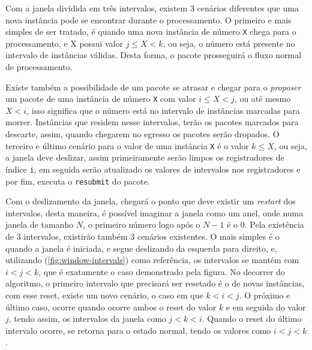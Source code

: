 \documentclass[
    12pt,
    openright, 
    oneside,
    a4paper,
    french,
    english,
    brazil
    ]{facom-ufu-abntex2}
\theoremstyle{definition}
\begin{document}

Com a janela dividida em três intervalos, existem 3 cenários diferentes que uma nova instância pode se encontrar durante o
processamento. O primeiro e mais simples de ser tratado, é quando uma nova instância de número \texttt{X} chega para
o processamento, e X possui valor $j \leq X < k$, ou seja, o número está presente no intervalo de instâncias válidas. 
Desta forma, o pacote prosseguirá o fluxo normal de processamento.

Existe também a possibilidade de um pacote se atrasar e chegar para o \emph{proposer} um pacote de uma instância de número
\texttt{X} com valor $i \leq X < j$, ou até mesmo $X < i$, isso significa que o número está no intervalo de instâncias
marcadas para morrer. Instâncias que residem nesse intervalos, terão os pacotes marcados para descarte, assim, quando
chegarem no egresso os pacotes serão dropados.
O terceiro e último cenário para o valor de uma instância \texttt{X} é o valor $k \leq X$, ou seja, a janela deve deslizar,
assim primeiramente serão limpos os registradores de índice \texttt{i}, em seguida serão atualizado os valores de
intervalos nos registradores e por fim, executa o \texttt{resubmit} do pacote.

Com o deslizamento da janela, chegará o ponto que deve existir um \emph{restart} dos intervalos, desta maneira, é possível
imaginar a janela como um anel, onde numa janela de tamanho $N$, o primeiro número logo após o $N - 1$ é o 0. Pela 
existência de 3 intervalos, existirão também 3 cenários existentes. O mais simples é o quando a janela é iniciada,
e segue deslizando da esquerda para direito, e, utilizando (\ref{fig:window-intervals}) como referência, os intervalos
se mantém com $i < j < k$, que é exatamente o caso demonstrado pela figura. No decorrer do algoritmo, o primeiro intervalo
que precisará ser resetado é o de novas instâncias, com esse reset, existe um novo cenário, o caso em que $k < i < j$.
O próximo e último caso, ocorre quando ocorre ambos o reset do valor $k$ e em seguida do valor $j$, tendo assim,
os intervalos da janela como $j < k < i$. Quando o reset do último intervalo ocorre, se retorna para o estado normal,
tendo os valores como $i < j < k$.
\end{document}
